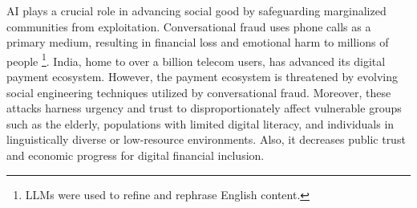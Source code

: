 \documentclass{article}
\begin{document}
AI plays a crucial role in advancing social good by safeguarding marginalized communities from exploitation. Conversational fraud uses phone calls as a primary medium, resulting in financial loss and emotional harm to millions of people \footnote{LLMs were used to refine and rephrase English content.}.
India, home to over a billion telecom users, has advanced its digital payment ecosystem. However, the payment ecosystem is threatened by evolving social engineering techniques utilized by conversational fraud. Moreover, these attacks harness urgency and trust to disproportionately affect vulnerable groups such as the elderly, populations with limited digital literacy, and individuals in linguistically diverse or low-resource environments. Also, it decreases public trust and economic progress for digital financial inclusion. 
\end{document}
